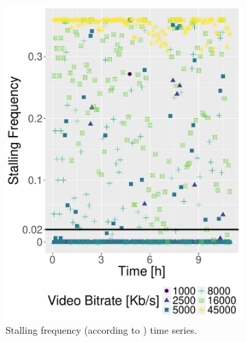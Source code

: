 \begin{figure}[!t]
    \centering
    \begin{subfigure}[b]{0.45\columnwidth}
        \includegraphics[width=\textwidth]{images/stallingfreq-timeseries.pdf}
        \caption{Stalling frequency (according to \cite{hossfeld2011transport}) time series.}
        \label{fig:stallingfreq}
    \end{subfigure}
    ~
    \begin{subfigure}[b]{0.45\columnwidth}

\end{subfigure}
\end{figure}
